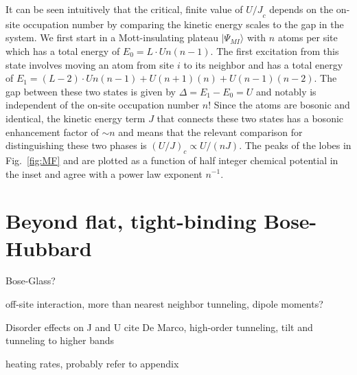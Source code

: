 It can be seen intuitively that the critical, finite value of ${U/J}_c$ depends on the on-site occupation number by comparing the kinetic energy scales to the gap in the system. We first start in a Mott-insulating plateau $|\Psi_{MI} \rangle$ with $n$ atoms per site which has a total energy of $E_0=L\cdot U n (n-1)$. The first excitation from this state involves moving an atom from site $i$ to its neighbor and has a total energy of $E_1 = (L-2) \cdot U n (n-1) + U(n+1)(n) + U(n-1)(n-2)$. The gap between these two states is given by $\Delta = E_1 - E_0 = U$ and notably is independent of the on-site occupation number $n$! Since the atoms are bosonic and identical, the kinetic energy term $J$ that connects these two states has a bosonic enhancement factor of $\sim n$ and means that the relevant comparison for distinguishing these two phases is $(U/J)_c \propto U/(n J)$. The peaks of the lobes in Fig.~\ref{fig:MF} and are plotted as a function of half integer chemical potential in the inset and agree with a power law exponent $n^{-1}$.


\section{Beyond flat, tight-binding Bose-Hubbard}

Bose-Glass?

off-site interaction, more than nearest neighbor tunneling, dipole moments?

Disorder effects on J and U cite De Marco, high-order tunneling, tilt and tunneling to higher bands

heating rates, probably refer to appendix












